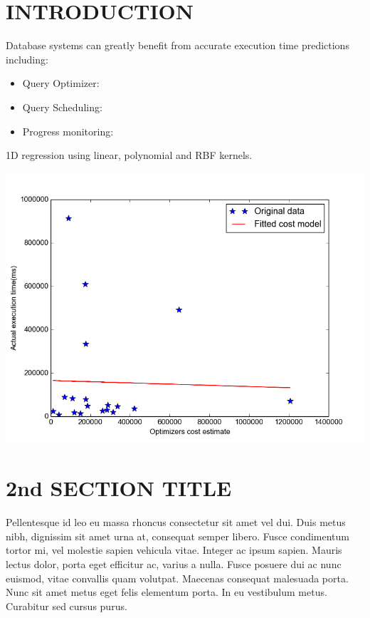 \documentclass{article}
\begin{document}
	\begin{multicols}{2}
	\section{INTRODUCTION}
	Database systems can greatly benefit from accurate execution time predictions including: 
	
	\begin{itemize}
	\item Query Optimizer: 
	\item Query Scheduling:
	\item Progress monitoring:
	\end{itemize}
	
	1D regression using linear, polynomial and RBF kernels.
	
	\includegraphics[scale=.33]{figure_1.png} 
		
	\section{2nd SECTION TITLE}
Pellentesque id leo eu massa rhoncus consectetur sit amet vel dui. Duis metus nibh, dignissim sit amet urna at, consequat semper libero. Fusce condimentum tortor mi, vel molestie sapien vehicula vitae. Integer ac ipsum sapien. Mauris lectus dolor, porta eget efficitur ac, varius a nulla. Fusce posuere dui ac nunc euismod, vitae convallis quam volutpat. Maecenas consequat malesuada porta. Nunc sit amet metus eget felis elementum porta. In eu vestibulum metus. Curabitur sed cursus purus.



\end{multicols}
\end{document}

